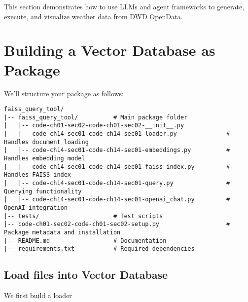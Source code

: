 This section demonstrates how to use LLMs and agent frameworks to generate, execute, and visualize weather data from DWD OpenData.

\section{Building a Vector Database as Package}

We'll structure your package as follows:

\begin{verbatim}
faiss_query_tool/
|-- faiss_query_tool/          # Main package folder
|   |-- code-ch01-sec02-code-ch01-sec02-__init__.py
|   |-- code-ch14-sec01-code-ch14-sec01-loader.py              # Handles document loading
|   |-- code-ch14-sec01-code-ch14-sec01-embeddings.py          # Handles embedding model
|   |-- code-ch14-sec01-code-ch14-sec01-faiss_index.py         # Handles FAISS index
|   |-- code-ch14-sec01-code-ch14-sec01-query.py               # Querying functionality
|   |-- code-ch14-sec01-code-ch14-sec01-openai_chat.py         # OpenAI integration
|-- tests/                     # Test scripts
|-- code-ch01-sec02-code-ch01-sec02-setup.py                   # Package metadata and installation
|-- README.md                  # Documentation
|-- requirements.txt           # Required dependencies
\end{verbatim}


\subsection{Load files into Vector Database}

We first build a loader











